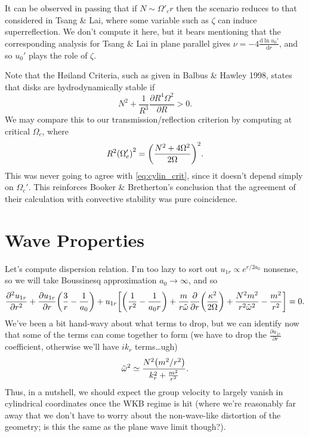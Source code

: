 \documentclass[11pt,
        usenames, %
        dvipsnames %
    ]{report}
\newcommand*{\rd}[2]{\frac{\mathrm{d}#1}{\mathrm{d}#2}}
\newcommand*{\pd}[2]{\frac{\partial#1}{\partial#2}}
\newcommand*{\ptd}[2]{\frac{\partial^2 #1}{\partial#2^2}}
\DeclarePairedDelimiter\p{\lparen}{\rparen}
\DeclarePairedDelimiter\s{\lbrack}{\rbrack}
\begin{document}
It can be observed in passing that if $N \sim \Omega'_c r$ then the scenario
reduces to that considered in Tsang \& Lai, where some variable such as $\zeta$
can induce superreflection. We don't compute it here, but it bears mentioning
that the corresponding analysis for Tsang \& Lai in plane parallel gives $\nu =
-4\rd{\ln u_0'}{r}$, and so $u_0'$ plays the role of $\zeta$.

Note that the H\o iland Criteria, such as given in Balbus \& Hawley 1998, states
that disks are hydrodynamically stable if
\begin{equation}
    N^2 + \frac{1}{R^3}\pd{R^4 \Omega^2}{R} > 0.
\end{equation}
We may compare this to our transmission/reflection criterion by computing at
critical $\Omega_c$, where
\begin{equation}
    R^2 \p*{\Omega_c'}^2 = \p*{\frac{N^2 + 4\Omega^2}{2\Omega}}^2.
\end{equation}
This was never going to agree with \autoref{eq:cylin_crit}, since it doesn't
depend simply on $\Omega_c'$. This reinforces Booker \& Bretherton's conclusion
that the agreement of their calculation with convective stability was pure
coincidence.

\section{Wave Properties}

Let's compute dispersion relation. I'm too lazy to sort out $u_{1r} \propto
e^{r/2a_0}$ nonsense, so we will take Boussinesq approximation $a_0 \to \infty$,
and so
\begin{equation}
    \ptd{u_{1r}}{r} + \pd{u_{1r}}{r}\p*{\frac{3}{r} - \frac{1}{a_0}}
        + u_{1r}\s*{\p*{\frac{1}{r^2} - \frac{1}{a_0r}}
            + \frac{m}{r\tilde{\omega}} \pd{}{r}\p*{\frac{\kappa^2}{2\Omega}}
            + \frac{N^2m^2}{r^2\tilde{\omega}^2} - \frac{m^2}{r^2}} = 0.
\end{equation}
We've been a bit hand-wavy about what terms to drop, but we can identify now
that some of the terms can come together to form (we have to drop the
$\pd{u_{1r}}{r}$ coefficient, otherwise we'll have $ik_r$ terms\dots ugh)
\begin{equation}
    \tilde{\omega}^2 \simeq \frac{N^2\p*{m^2/r^2}}{k_r^2 + \frac{m^2}{r^2}}.
\end{equation}
Thus, in a nutshell, we should expect the group velocity to largely vanish in
cylindrical coordinates once the WKB regime is hit (where we're reasonably far
away that we don't have to worry about the non-wave-like distortion of the
geometry; is this the same as the plane wave limit though?).
\end{document}
